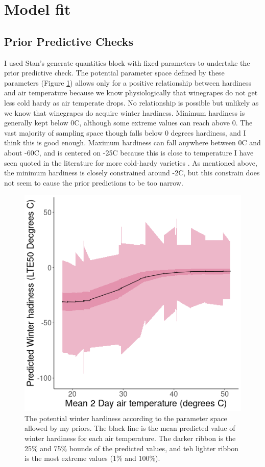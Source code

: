 \documentclass[11pt,letter]{article}
\begin{document}
\section{Model fit}
\subsection{Prior Predictive Checks}
I used Stan's generate quantities block with fixed parameters to undertake the prior predictive check. The potential parameter space defined by these parameters (Figure \ref{fig:priorPredictions}) allows only for a positive relationship between hardiness and air temperature because we know physiologically that winegrapes do not get less cold hardy as air temperate drops. No relationship is possible but unlikely as we know that winegrapes do acquire winter hardiness. Minimum hardiness is generally kept below 0\textdegree C, although some extreme values can reach above 0. The vast majority of sampling space though falls below 0 degrees hardiness, and I think this is good enough. Maximum hardiness can fall anywhere between 0\textdegree C and about -60\textdegree C, and is centered on -25\textdegree C because this is close to temperature I have seen quoted in the literature for more cold-hardy varieties \cite{Hubackova1996,Ferguson2014,Kovaleski2018a}. As mentioned above, the minimum hardiness is closely constrained around -2\textdegree C, but this constrain does not seem to cause the prior predictions to be too narrow.    

\begin{figure}
  \includegraphics[scale = 0.5]{PriorPrediction.png}
  \caption{The potential winter hardiness according to the parameter space allowed by my priors. The black line is the mean predicted value of winter hardiness for each air temperature. The darker ribbon is the 25\% and 75\% bounds of the predicted values, and teh lighter ribbon is the most extreme values (1\% and 100\%).}
  \label{fig:priorPredictions}
\end{figure}
\end{document}
